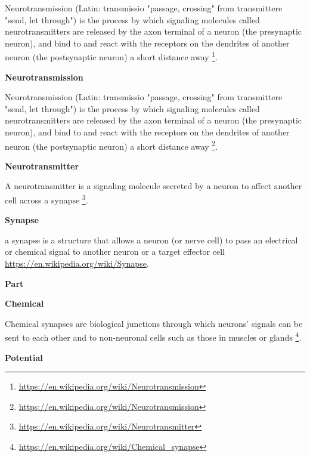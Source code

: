 \documentclass{book}
\providecommand{\ProjectDeepHeading}[2]{%
    \par\medskip\noindent\textbf{#2}\par\smallskip
}
\providecommand{\seeherefooter}[1]{\footnote{\url{#1}}}
\begin{document}
Neurotransmission (Latin: transmissio "passage, crossing" from transmittere "send, let through") is the process by which signaling molecules called neurotransmitters are released by the axon terminal of a neuron (the presynaptic neuron), and bind to and react with the receptors on the dendrites of another neuron (the postsynaptic neuron) a short distance away \seeherefooter{https://en.wikipedia.org/wiki/Neurotransmission}.

\ProjectDeepHeading{2}{Neurotransmission}


Neurotransmission (Latin: transmissio "passage, crossing" from transmittere "send, let through") is the process by which signaling molecules called neurotransmitters are released by the axon terminal of a neuron (the presynaptic neuron), and bind to and react with the receptors on the dendrites of another neuron (the postsynaptic neuron) a short distance away \seeherefooter{https://en.wikipedia.org/wiki/Neurotransmission}.

\ProjectDeepHeading{3}{Neurotransmitter}


A neurotransmitter is a signaling molecule secreted by a neuron to affect another cell across a synapse \seeherefooter{https://en.wikipedia.org/wiki/Neurotransmitter}.

\ProjectDeepHeading{2}{Synapse}


a synapse is a structure that allows a neuron (or nerve cell) to pass an electrical or chemical signal to another neuron or a target effector cell \url{https://en.wikipedia.org/wiki/Synapse}.

\ProjectDeepHeading{3}{Part}

\ProjectDeepHeading{4}{Chemical}


Chemical synapses are biological junctions through which neurons' signals can be sent to each other and to non-neuronal cells such as those in muscles or glands \seeherefooter{https://en.wikipedia.org/wiki/Chemical_synapse}.

\ProjectDeepHeading{4}{Potential}
\end{document}
